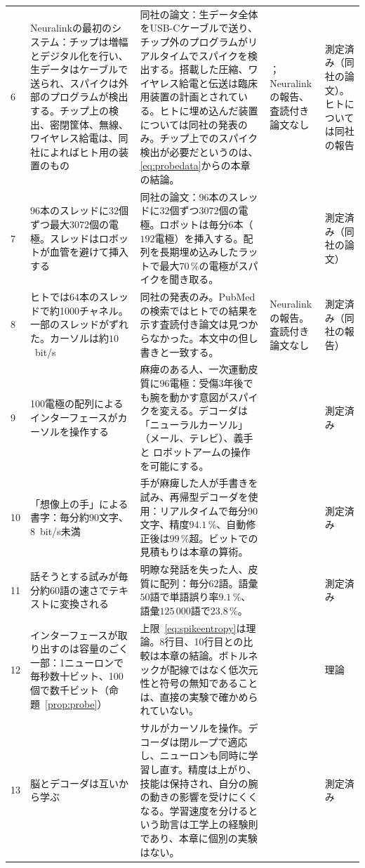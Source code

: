 {\begin{longtable}{>{\raggedright}p{0.5cm}>{\raggedright}p{4.0cm}>{\raggedright}p{5.6cm}>{\raggedright}p{2.3cm}>{\raggedright\arraybackslash}p{1.7cm}}
6 & Neuralinkの最初のシステム：チップは増幅とデジタル化を行い、生データはケーブルで送られ、スパイクは外部のプログラムが検出する。チップ上の検出、密閉筐体、無線、ワイヤレス給電は、同社によればヒト用の装置のもの & 同社の論文：生データ全体をUSB-Cケーブルで送り、チップ外のプログラムがリアルタイムでスパイクを検出する。搭載した圧縮、ワイヤレス給電と伝送は臨床用装置の計画とされている。ヒトに埋め込んだ装置については同社の発表のみ。チップ上でのスパイク検出が必要だというのは、\eqref{eq:probedata}からの本章の結論。 & \cite{Musk2019}；Neuralinkの報告、査読付き論文なし & 測定済み（同社の論文）。ヒトについては同社の報告 \\
7 & $96$本のスレッドに$32$個ずつ最大$3072$個の電極。スレッドはロボットが血管を避けて挿入する & 同社の論文：$96$本のスレッドに$32$個ずつ$3072$個の電極。ロボットは毎分$6$本（$192$電極）を挿入する。配列を長期埋め込みしたラットで最大$70\,\%$の電極がスパイクを聞き取る。 & \cite{Musk2019} & 測定済み（同社の論文） \\
8 & ヒトでは$64$本のスレッドで約1000チャネル。一部のスレッドがずれた。カーソルは約$10$~bit/s & 同社の発表のみ。PubMedの検索ではヒトでの結果を示す査読付き論文は見つからなかった。本文中の但し書きと一致する。 & Neuralinkの報告。査読付き論文なし & 測定済み（同社の報告） \\
9 & 100電極の配列によるインターフェースがカーソルを操作する & 麻痺のある人、一次運動皮質に$96$電極：受傷3年後でも腕を動かす意図がスパイクを変える。デコーダは「ニューラルカーソル」（メール、テレビ）、義手と ロボットアームの操作を可能にする。 & \cite{Hochberg2006} & 測定済み \\
10 & 「想像上の手」による書字：毎分約$90$文字、$8$~bit/s未満 & 手が麻痺した人が手書きを試み、再帰型デコーダを使用：リアルタイムで毎分$90$文字、精度$94.1\,\%$、自動修正後は$99\,\%$超。ビットでの見積もりは本章の算術。 & \cite{Willett2021} & 測定済み \\
11 & 話そうとする試みが毎分約$60$語の速さでテキストに変換される & 明瞭な発話を失った人、皮質に配列：毎分$62$語。語彙$50$語で単語誤り率$9.1\,\%$、語彙$125\,000$語で$23.8\,\%$。 & \cite{Willett2023} & 測定済み \\
12 & インターフェースが取り出すのは容量のごく一部：1ニューロンで毎秒数十ビット、100個で数千ビット（命題~\ref{prop:probe}） & 上限~\eqref{eq:spikeentropy}は理論。8行目、10行目との比較は本章の結論。ボトルネックが配線ではなく低次元性と符号の無知であることは、直接の実験で確かめられていない。 & \cite{Rieke1997} & 理論 \\
13 & 脳とデコーダは互いから学ぶ & サルがカーソルを操作。デコーダは閉ループで適応し、ニューロンも同時に学習し直す。精度は上がり、技能は保持され、自分の腕の動きの影響を受けにくくなる。学習速度を分けるという助言は工学上の経験則であり、本章に個別の実験はない。 & \cite{Orsborn2014coad} & 測定済み \\

\end{longtable}}
